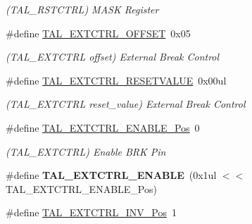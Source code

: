 \begin{DoxyCompactItemize}
\begin{DoxyCompactList}\small\item\em (T\+A\+L\+\_\+\+R\+S\+T\+C\+T\+R\+L) M\+A\+S\+K Register \end{DoxyCompactList}\item 
\hypertarget{group___s_a_m_l21___t_a_l_ga9278f9fce5891da5ee4dc038887e1a24}{}\#define \hyperlink{group___s_a_m_l21___t_a_l_ga9278f9fce5891da5ee4dc038887e1a24}{T\+A\+L\+\_\+\+E\+X\+T\+C\+T\+R\+L\+\_\+\+O\+F\+F\+S\+E\+T}~0x05\label{group___s_a_m_l21___t_a_l_ga9278f9fce5891da5ee4dc038887e1a24}

\begin{DoxyCompactList}\small\item\em (T\+A\+L\+\_\+\+E\+X\+T\+C\+T\+R\+L offset) External Break Control \end{DoxyCompactList}\item 
\hypertarget{group___s_a_m_l21___t_a_l_gaf82de9e3cc964c63862701f537d11cd8}{}\#define \hyperlink{group___s_a_m_l21___t_a_l_gaf82de9e3cc964c63862701f537d11cd8}{T\+A\+L\+\_\+\+E\+X\+T\+C\+T\+R\+L\+\_\+\+R\+E\+S\+E\+T\+V\+A\+L\+U\+E}~0x00ul\label{group___s_a_m_l21___t_a_l_gaf82de9e3cc964c63862701f537d11cd8}

\begin{DoxyCompactList}\small\item\em (T\+A\+L\+\_\+\+E\+X\+T\+C\+T\+R\+L reset\+\_\+value) External Break Control \end{DoxyCompactList}\item 
\hypertarget{group___s_a_m_l21___t_a_l_gafd9581a8437ff032a270bdc05e61657f}{}\#define \hyperlink{group___s_a_m_l21___t_a_l_gafd9581a8437ff032a270bdc05e61657f}{T\+A\+L\+\_\+\+E\+X\+T\+C\+T\+R\+L\+\_\+\+E\+N\+A\+B\+L\+E\+\_\+\+Pos}~0\label{group___s_a_m_l21___t_a_l_gafd9581a8437ff032a270bdc05e61657f}

\begin{DoxyCompactList}\small\item\em (T\+A\+L\+\_\+\+E\+X\+T\+C\+T\+R\+L) Enable B\+R\+K Pin \end{DoxyCompactList}\item 
\hypertarget{group___s_a_m_l21___t_a_l_gaecfeffb362698ee695d6e4d959195104}{}\#define {\bfseries T\+A\+L\+\_\+\+E\+X\+T\+C\+T\+R\+L\+\_\+\+E\+N\+A\+B\+L\+E}~(0x1ul $<$$<$ T\+A\+L\+\_\+\+E\+X\+T\+C\+T\+R\+L\+\_\+\+E\+N\+A\+B\+L\+E\+\_\+\+Pos)\label{group___s_a_m_l21___t_a_l_gaecfeffb362698ee695d6e4d959195104}

\item 
\hypertarget{group___s_a_m_l21___t_a_l_ga09e745b05ff4d571959b6203ee4a425a}{}\#define \hyperlink{group___s_a_m_l21___t_a_l_ga09e745b05ff4d571959b6203ee4a425a}{T\+A\+L\+\_\+\+E\+X\+T\+C\+T\+R\+L\+\_\+\+I\+N\+V\+\_\+\+Pos}~1\label{group___s_a_m_l21___t_a_l_ga09e745b05ff4d571959b6203ee4a425a}


\end{DoxyCompactItemize}
